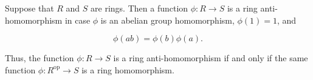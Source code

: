 Suppose that $R$ and $S$ are rings. Then a function $\phi: R \rightarrow S$ is a ring anti-homomorphism in case $\phi$ is an abelian group homomorphism, $\phi(1) = 1$, and

$$\phi(ab) = \phi(b)\phi(a).$$

Thus, the function $\phi: R \rightarrow S$ is a ring anti-homomorphism if and only if the same function $\phi: R^{\text{op}} \rightarrow S$ is a ring homomorphism.
